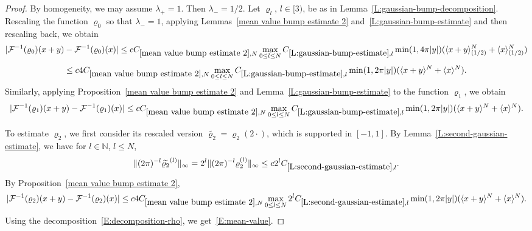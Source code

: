 \documentclass[12pt,reqno]{amsart}
\theoremstyle{plain}
\numberwithin{equation}{section}
\theoremstyle{remark}
\begin{document}
\begin{proof}
By homogeneity, we may assume $\lambda_{+}=1$. Then $\lambda_{-}=1/2$.
Let $\varrho_l$, $l\in [3)$, be as in Lemma~\ref{L:gaussian-bump-decomposition}. Rescaling the function $\varrho_0$ so that $\lambda_{-}=1$, applying Lemmas~\ref{mean value bump estimate 2} and~\ref{L:gaussian-bump-estimate} and then rescaling back, we obtain
\begin{equation*}
     |\mathcal{F}^{-1}(\varrho_0)(x+y)-\mathcal{F}^{-1}(\varrho_0)(x)|\le cC_{\ref{mean value bump estimate 2},N}\max_{0\leq l \leq N} C_{\ref{L:gaussian-bump-estimate},l}
     \min(1,4\pi|y|) (\langle x+y\rangle^N_{(1/2)}+
\langle x\rangle^N_{(1/2)})
\end{equation*}
\[
\leq c 4C_{\ref{mean value bump estimate 2},N} \max_{0\leq l \leq N} C_{\ref{L:gaussian-bump-estimate},l} \min(1,2\pi|y|) (\langle x+y\rangle^N+
\langle x\rangle^N).
\]
Similarly, applying Proposition~\ref{mean value bump estimate 2} and Lemma~\ref{L:gaussian-bump-estimate} to the function $\varrho_1$, we obtain
\begin{equation*}
     |\mathcal{F}^{-1}(\varrho_1)(x+y)-\mathcal{F}^{-1}(\varrho_1)(x)|\le c C_{\ref{mean value bump estimate 2},N}\max_{0\leq l \leq N} C_{\ref{L:gaussian-bump-estimate},l}
     \min(1,2\pi|y|) (\langle x+y\rangle^N+
\langle x\rangle^N).
\end{equation*}

To estimate $\varrho_2$, we first consider its rescaled version $\widetilde{\varrho_2}=\varrho_2(2\cdot)$, which is supported in $[-1,1]$. By Lemma~\ref{L:second-gaussian-estimate}, we have for $l\in \mathbb N$, $l\leq N$,
\[
\|(2\pi)^{-l}\widetilde{\varrho_2}^{(l)}\|_{\infty}
=2^l\|(2\pi)^{-l}\varrho_2^{(l)}\|_{\infty}
\leq c 2^lC_{\ref{L:second-gaussian-estimate},l}.
\]
By Proposition~\ref{mean value bump estimate 2},
\begin{equation*}
     |\mathcal{F}^{-1}(\varrho_2)(x+y)-\mathcal{F}^{-1}(\varrho_2)(x)|\le c 4C_{\ref{mean value bump estimate 2},N}\max_{0\leq l \leq N} 2^lC_{\ref{L:second-gaussian-estimate},l}
     \min(1,2\pi|y|) (\langle x+y\rangle^N+
\langle x\rangle^N).
\end{equation*}
Using the decomposition~\eqref{E:decomposition-rho}, we get~\eqref{E:mean-value}.
\end{proof}
\end{document}
